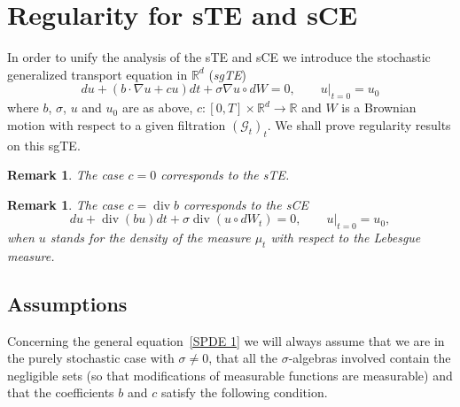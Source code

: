 \documentclass[a4paper,10pt]{article}
\newtheorem{remark}[theorem]{Remark}
\newcommand{\mc}{\mathcal}
\begin{document}
\section{Regularity for sTE and sCE\label{section regularity}}

In order to unify the analysis of the sTE and sCE we introduce the stochastic
generalized transport equation in $\mathbb{R}^{d}$ (\textit{sgTE})
\begin{equation}
du+(b\cdot\nabla u+cu)  dt+\sigma\nabla u\circ dW=0,\qquad
u|_{t=0}=u_{0} \label{SPDE 1} 
\end{equation}
where $b$, $\sigma$, $u$ and $u_{0}$ are as above, $c \colon [
0,T]  \times\mathbb{R}^{d}\rightarrow\mathbb{R}$ and $W$ is a Brownian motion with respect to a given filtration $(\mc{G}_t)_t$. We shall prove
regularity results on this sgTE.

\begin{remark}
The case $c=0$ corresponds to the sTE.
\end{remark}

\begin{remark}
The case $c=\operatorname{div}b$ corresponds to the sCE
\begin{equation}
du+\operatorname{div} (bu)  dt+\sigma\operatorname{div} 
(  u\circ dW_{t} )  =0,\qquad u|_{t=0}=u_{0},
\label{sCE for density}
\end{equation}
when $u$ stands for the density of the measure $\mu_t$ with respect to the
Lebesgue measure.
\end{remark}

\subsection{Assumptions\label{subsection regularity assumptions}}

Concerning the general equation~\eqref{SPDE 1} we will always assume that we are in the purely stochastic case with $\sigma\neq0$, that all the $\sigma$-algebras involved contain the negligible sets (so that modifications of measurable functions are measurable) and that the coefficients $b$ and $c$ satisfy the following condition.
\end{document}
